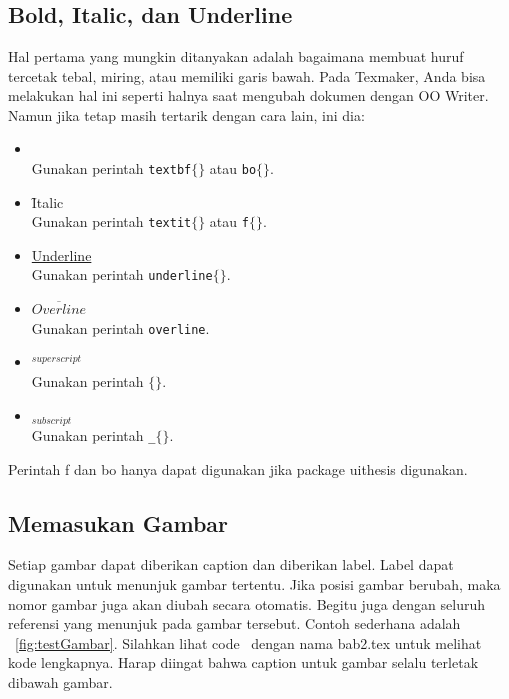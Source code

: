 \chapter{\babTiga}


\section{Bold, Italic, dan Underline}
Hal pertama yang mungkin ditanyakan adalah bagaimana membuat huruf tercetak 
tebal, miring, atau memiliki garis bawah. 
Pada Texmaker, Anda bisa melakukan hal ini seperti halnya saat mengubah dokumen 
dengan OO Writer. 
Namun jika tetap masih tertarik dengan cara lain, ini dia: 

\begin{itemize}
	\item {} \\
		Gunakan perintah \texttt{\bslash textbf$\lbrace\rbrace$} atau 
		\texttt{\bslash bo$\lbrace\rbrace$}. 
	\item \f{Italic} \\
		Gunakan perintah \texttt{\bslash textit$\lbrace\rbrace$} atau 
		\texttt{\bslash f$\lbrace\rbrace$}. 
	\item \underline{Underline} \\
		Gunakan perintah \texttt{\bslash underline$\lbrace\rbrace$}.
	\item $\overline{Overline}$ \\
		Gunakan perintah \texttt{\bslash overline}. 
	\item $^{superscript}$ \\
		Gunakan perintah \texttt{\bslash $\lbrace\rbrace$}. 
	\item $_{subscript}$ \\
		Gunakan perintah \texttt{\bslash \_$\lbrace\rbrace$}. 
\end{itemize}

Perintah \bslash f dan \bslash bo hanya dapat digunakan jika package 
uithesis digunakan. 


\section{Memasukan Gambar}
Setiap gambar dapat diberikan caption dan diberikan label. Label dapat 
digunakan untuk menunjuk gambar tertentu. 
Jika posisi gambar berubah, maka nomor gambar juga akan diubah secara 
otomatis. 
Begitu juga dengan seluruh referensi yang menunjuk pada gambar tersebut. 
Contoh sederhana adalah \pic~\ref{fig:testGambar}. 
Silahkan lihat code \latex~dengan nama bab2.tex untuk melihat kode lengkapnya. 
Harap diingat bahwa caption untuk gambar selalu terletak dibawah gambar. 

